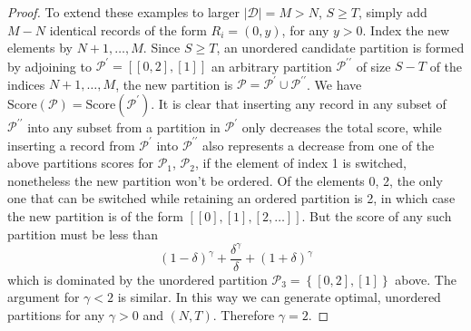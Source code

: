 \documentclass{article}
\theoremstyle{case}
\begin{document}
\begin{proof}
To extend these examples to larger $\vert \mathcal{D} \vert = M > N$, $S \geq T$, simply add $M-N$ identical records of the form $R_i = \left( 0, y\right)$, for any $y > 0$. Index the new elements by $N+1, \dots, M$. Since $S \geq T$, an unordered candidate partition is formed by adjoining to $\mathcal{P}^{\prime} = \left[\left[0, 2\right], \left[ 1\right]\right]$ an arbitrary partition $\mathcal{P}^{\prime\prime}$ of size $S - T$ of the indices $N+1, \dots, M$, the new partition is $\mathcal{P} = \mathcal{P}^{\prime} \cup \mathcal{P}^{\prime\prime}$. We have $\text{Score}\left(\mathcal{P}\right) = \text{Score}\left(\mathcal{P}^{\prime}\right)$. It is clear that inserting any record in any subset of $\mathcal{P}^{\prime\prime}$ into any subset from a partition in $\mathcal{P}^{\prime}$ only decreases the total score, while inserting a record from $\mathcal{P}^{\prime}$ into $\mathcal{P}^{\prime\prime}$ also represents a decrease from one of the above partitions scores for $\mathcal{P}_1$, $\mathcal{P}_2$, if the element of index 1 is switched, nonetheless the new partition won't be ordered. Of the elements 0, 2, the only one that can be switched while retaining an ordered partition is 2, in which case the new partition is of the form $\left[ \left[ 0\right], \left[ 1\right], \left[ 2, \dots\right]\right]$. But the score of any such partition must be less than
\[
\left( 1-\delta\right)^\gamma + \frac{\delta^\gamma}{\delta} + \left( 1+\delta\right)^\gamma
\]
which is dominated by the unordered partition $\mathcal{P}_3 = \left\lbrace \left[ 0, 2 \right], \left[ 1 \right]\right\rbrace$ above. The argument for $\gamma < 2$ is similar. In this way we can generate optimal, unordered partitions for any $\gamma > 0$ and $\left( N, T\right)$. Therefore $\gamma = 2$.


\end{proof}
\end{document}
